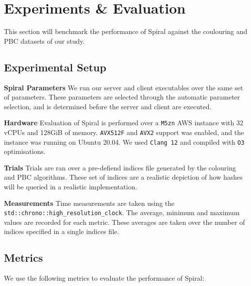 \section{Experiments \& Evaluation}

This section will benchmark the performance of Spiral against the coulouring and PBC
datasets of our study.

\subsection{Experimental Setup}

\textbf{Spiral Parameters} \hspace{0.3cm} We run our server and client executables over the same set
of parameters. These parameters are selected through the automatic parameter
selection\cite{1}, and is determined before the server and client are executed.

\textbf{Hardware} \hspace{0.3cm} Evaluation of Spiral is performed over a \texttt{M5zn} AWS
instance with 32 vCPUs and 128GiB of memory. \texttt{AVX512F} and \texttt{AVX2}
support was enabled, and the instance was running on Ubuntu 20.04. We used \texttt{Clang
12} and compiled with \texttt{O3} optimisations.

\textbf{Trials} \hspace{0.3cm} Trials are ran over a pre-defiend indices file generated by
 the colouring and PBC algorithms. These set of indices are a realistic depiction of how
 hashes will be queried in a realistic implementation.

\textbf{Measurements} \hspace{0.3cm} Time measurements are taken using the
\texttt{std::chrono::high\_resolution\_clock}. The average, minimum and maximum values are
recorded for each metric. These averages are taken over the number of indices specified in
a single indices file.

\subsection{Metrics}

We use the following metrics to evaluate the performance of Spiral:

